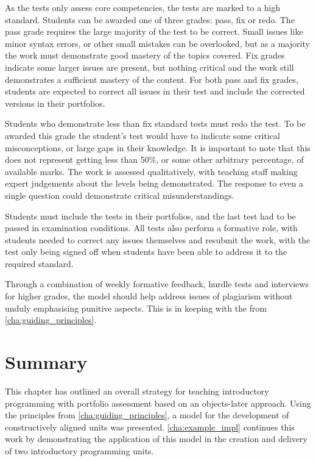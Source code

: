 As the tests only assess core competencies, the tests are marked to a high standard. Students can be awarded one of three grades: pass, fix or redo. The pass grade requires the large majority of the test to be correct. Small issues like minor syntax errors, or other small mistakes can be overlooked, but as a majority the work must demonstrate good mastery of the topics covered. Fix grades indicate some larger issues are present, but nothing critical and the work still demonstrates a sufficient mastery of the content. For both pass and fix grades, students are expected to correct all issues in their test and include the corrected versions in their portfolios. 

Students who demonstrate less than fix standard tests must redo the test. To be awarded this grade the student's test would have to indicate some critical misconceptions, or large gaps in their knowledge. It is important to note that this does not represent getting less than 50\%, or some other arbitrary percentage, of available marks. The work is assessed qualitatively, with teaching staff making expert judgements about the levels being demonstrated. The response to even a single question could demonstrate critical misunderstandings.

Students must include the tests in their portfolios, and the last test had to be passed in examination conditions. All tests also perform a formative role, with students needed to correct any issues themselves and resubmit the work, with the test only being signed off when students have been able to address it to the required standard.

Through a combination of weekly formative feedback, hurdle tests and interviews for higher grades, the model should help address issues of plagiarism without unduly emphasising punitive aspects. This is in keeping with the  from \cref{cha:guiding_principles}.


\section{Summary} %
\label{sec:summary}

This chapter has outlined an overall strategy for teaching introductory programming with portfolio assessment based on an objects-later approach. Using the principles from \cref{cha:guiding_principles}, a model for the development of constructively aligned units was presented. \cref{cha:example_impl} continues this work by demonstrating the application of this model in the creation and delivery of two introductory programming units.


